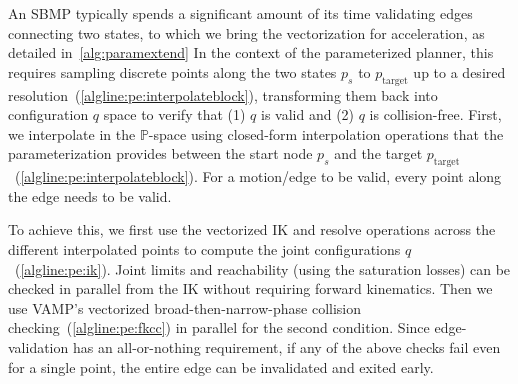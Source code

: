 \documentclass[letterpaper, 10 pt, conference]{ieeeconf}
\begin{document}
 
An SBMP typically spends a significant amount of its time validating edges connecting two states, to which we bring the vectorization for acceleration, as detailed in~\cref{alg:paramextend}
In the context of the parameterized planner, this requires sampling discrete points along the two states $p_s$ to $p_\text{target}$ up to a desired resolution~(\cref{algline:pe:interpolateblock}), transforming them back into configuration $q$ space to verify that (1) $q$ is valid and (2) $q$ is collision-free. First, we interpolate in the $\mathbb{P}$-space using closed-form interpolation operations that the parameterization provides between the start node $p_s$ and the target $p_\text{target}$~(\cref{algline:pe:interpolateblock}). For a motion/edge to be valid, every point along the edge needs to be valid.


To achieve this, we first use the vectorized IK and resolve operations across the different interpolated points to compute the joint configurations $q$~(\cref{algline:pe:ik}). Joint limits and reachability (using the saturation losses) can be checked in parallel from the IK without requiring forward kinematics. Then we use VAMP's vectorized broad-then-narrow-phase collision checking~(\cref{algline:pe:fkcc}) in parallel for the second condition. Since edge-validation has an all-or-nothing requirement, if any of the above checks fail even for a single point, the entire edge can be invalidated and exited early.

\end{document}
